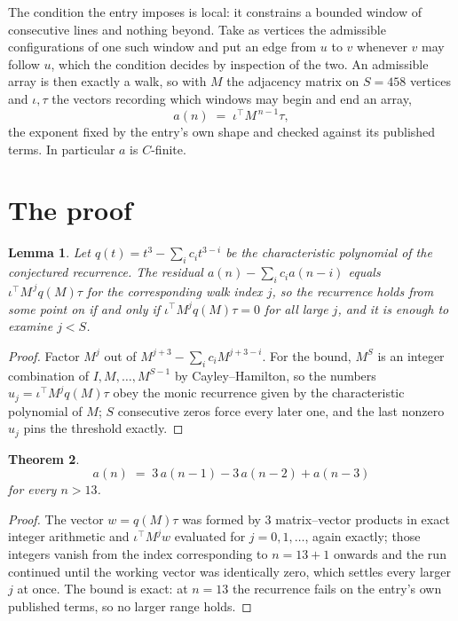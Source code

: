 \documentclass[11pt,a4paper]{article}
\theoremstyle{plain}
\newtheorem{theorem}{Theorem}
\newtheorem{lemma}[theorem]{Lemma}
\theoremstyle{definition}
\begin{document}
The condition the entry imposes is local: it constrains a bounded window of consecutive lines and nothing beyond. Take as
vertices the admissible configurations of one such window and put an edge from $u$ to $v$
whenever $v$ may follow $u$, which the condition decides by inspection of the two. An
admissible array is then exactly a walk, so with $M$ the adjacency matrix on $S=458$ vertices
and $\iota,\tau$ the vectors recording which windows may begin and end an array,
\[
a(n)\;=\;\iota^{\!\top}M^{\,n-1}\tau ,
\]
the exponent fixed by the entry's own shape and checked against its published terms. In
particular $a$ is $C$-finite.

\section{The proof}

\begin{lemma}\label{lem:crit}
Let $q(t)=t^{3}-\sum_i c_it^{3-i}$ be the characteristic polynomial of the
conjectured recurrence. The residual $a(n)-\sum_ic_ia(n-i)$ equals
$\iota^{\!\top}M^{\,j}q(M)\tau$ for the corresponding walk index $j$, so the recurrence
holds from some point on if and only if $\iota^{\!\top}M^{j}q(M)\tau=0$ for all large $j$,
and it is enough to examine $j<S$.
\end{lemma}

\begin{proof}
Factor $M^{j}$ out of $M^{j+3}-\sum_ic_iM^{j+3-i}$. For the bound, $M^{S}$
is an integer combination of $I,M,\dots,M^{S-1}$ by Cayley--Hamilton, so the numbers
$u_j=\iota^{\!\top}M^{j}q(M)\tau$ obey the monic recurrence given by the characteristic
polynomial of $M$; $S$ consecutive zeros force every later one, and the last nonzero $u_j$
pins the threshold exactly.
\end{proof}

\begin{theorem}
\[
a(n)\;=\;3\,a(n-1) - 3\,a(n-2) + a(n-3)
\]
for every $n>13$.
\end{theorem}

\begin{proof}
The vector $w=q(M)\tau$ was formed by $3$ matrix--vector products in exact integer
arithmetic and $\iota^{\!\top}M^{j}w$ evaluated for $j=0,1,\dots$, again exactly; those
integers vanish from the index corresponding to $n=13+1$ onwards and the run continued
until the working vector was identically zero, which settles every larger $j$ at once. The bound is exact: at $n=13$ the recurrence fails on the entry's own published terms, so no larger range holds.
\end{proof}
\end{document}
